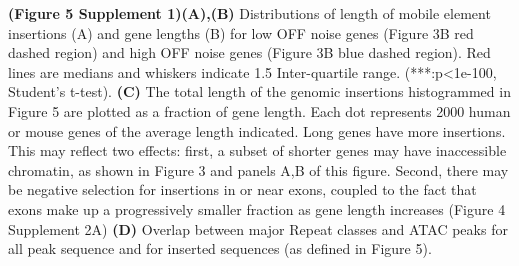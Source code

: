 \textbf{(Figure 5 Supplement 1)}\textbf{(A),(B)} Distributions of length of mobile element insertions (A) and gene lengths (B) for low OFF noise genes (Figure 3B red dashed region) and high OFF noise genes (Figure 3B blue dashed region). Red lines are medians and whiskers indicate 1.5 Inter-quartile range. (***:p<1e-100, Student’s t-test). \textbf{(C)} The total length of the genomic insertions histogrammed in Figure 5 are plotted as a fraction of gene length. Each dot represents 2000 human or mouse genes of the average length indicated. Long genes have more insertions. This may reflect two effects: first, a subset of shorter genes may have inaccessible chromatin, as shown in Figure 3 and panels A,B of this figure. Second, there may be negative selection for insertions in or near exons, coupled to the fact that exons make up a progressively smaller fraction as gene length increases (Figure 4 Supplement 2A) \textbf{(D)} Overlap between major Repeat classes and ATAC peaks for all peak sequence and for inserted sequences (as defined in Figure 5).